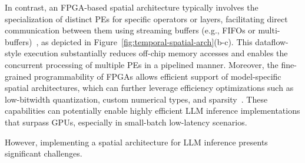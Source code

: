 In contrast, an FPGA-based spatial architecture typically involves the specialization of distinct PEs for specific operators or layers, facilitating direct communication between them using streaming buffers (e.g., FIFOs or multi-buffers)~\cite{xiang2022heteroflow,wang2021autosa,yaman2017finn,petrica2020dataflowcnn}, as depicted in Figure~\ref{fig:temporal-spatial-arch}(b-c).
This dataflow-style execution substantially reduces off-chip memory accesses and enables the concurrent processing of multiple PEs in a pipelined manner. 
Moreover, the fine-grained programmability of FPGAs allows efficient support of model-specific spatial architectures, which can further leverage efficiency optimizations such as low-bitwidth quantization, custom numerical types, and sparsity~\cite{zhang2021fracbnn,sun2022autovit,yang2023aim,peng2022sparsefpga}. These capabilities can potentially enable highly efficient LLM inference implementations that surpass GPUs, especially in small-batch low-latency scenarios.


However, implementing a spatial architecture for LLM inference presents significant challenges.

